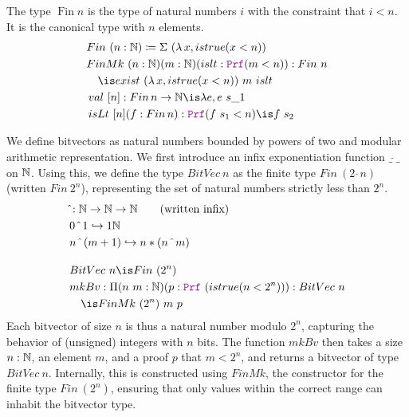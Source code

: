 \begin{definition}[Fin]\label{def:fin-def}
The type $\mathop{Fin} n$ is the type of natural numbers $i$ with the constraint that $i < n$.
It is the canonical type with $n$ elements.
\begin{align*}
& Fin~(n: \N) \coloneq \Sigma~(\lambda\,x, istrue(x < n)) \\
& FinMk~(n: \N) (m: \N) (islt: \prf (m < n)) : Fin~n \\
&\quad\is exist~(\lambda\,x, istrue(x <n))~m~islt\\
&\mathop{val}~[n]: \mathop{Fin} n \ra \N \is \lambda e, e~s\_1 \\
&\mathop{isLt}~[n] (f: \mathop{Fin} n): \prf (f~s_1 < n) \is f~s_2\\
\end{align*}
\end{definition}

\begin{definition}[Bitvector]\label{def:bv-def}
We define bitvectors as natural numbers bounded by powers of two and modular arithmetic representation.
We first introduce an infix exponentiation function $\_\,\hat{}\,\_$ on $\mathbb{N}$.
Using this, we define the type $BitVec~n$ as the finite type $Fin~(2~\hat~n)$ (written $Fin~2^n$), representing the set of natural numbers strictly less than $2^n$.
\begin{align*}
& \hat{}: \N \ra \N \ra \N \qquad \text{(written inﬁx)}\\
& 0 ~\hat{}~ 1 \re 1 \N\\
& n ~\hat{}~ (m + 1) \re n * (n ~\hat{}~ m)\\[1em]
&BitVec~n \is Fin~(2^n) \\ 
& mkBv: \Pi(n~m: \N)(p: \prf~(istrue(n < 2^n))): BitVec~n\\
&\quad\is FinMk~(2^n)~m~p
\end{align*}
Each bitvector of size $n$ is thus a natural number modulo $2^n$, capturing the behavior of (unsigned) integers with $n$ bits.
The function $mkBv$ then takes a size $n: \mathbb{N}$, an element $m$, and a proof $p$ that $m < 2^n$, and returns a bitvector of type $BitVec~n$.
Internally, this is constructed using $FinMk$, the constructor for the finite type $Fin~(2^n)$, ensuring that only values within the correct range can inhabit the bitvector type. 
\end{definition}

